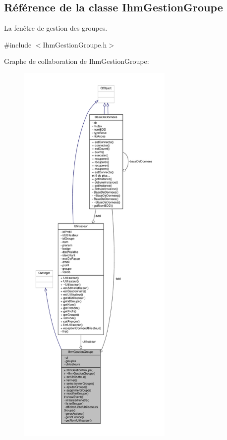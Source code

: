 \hypertarget{class_ihm_gestion_groupe}{}\subsection{Référence de la classe Ihm\+Gestion\+Groupe}
\label{class_ihm_gestion_groupe}


La fenêtre de gestion des groupes.  




{\ttfamily \#include $<$Ihm\+Gestion\+Groupe.\+h$>$}



Graphe de collaboration de Ihm\+Gestion\+Groupe\+:\nopagebreak
\begin{figure}[H]
\begin{center}
\leavevmode
\includegraphics[height=550pt]{class_ihm_gestion_groupe__coll__graph}
\end{center}
\end{figure}
